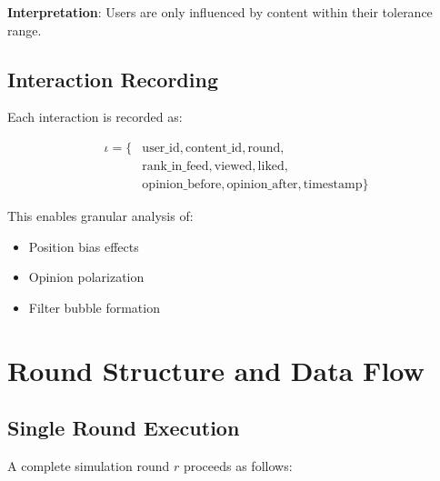 \documentclass[11pt]{article}
\begin{document}
\textbf{Interpretation}: Users are only influenced by content within their tolerance range.

\subsection{Interaction Recording}

Each interaction is recorded as:

\begin{align}
\iota = \{&\text{user\_id}, \text{content\_id}, \text{round}, \\
         &\text{rank\_in\_feed}, \text{viewed}, \text{liked}, \\
         &\text{opinion\_before}, \text{opinion\_after}, \text{timestamp}\}
\end{align}

This enables granular analysis of:
\begin{itemize}
    \item Position bias effects
    \item Opinion polarization
    \item Filter bubble formation
\end{itemize}

\section{Round Structure and Data Flow}

\subsection{Single Round Execution}

A complete simulation round $r$ proceeds as follows:
\end{document}
